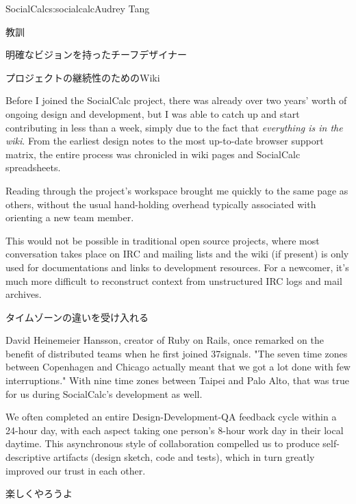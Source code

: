 \begin{aosachapter}{SocialCalc}{s:socialcalc}{Audrey Tang}
\begin{aosasect1}{教訓}
\begin{aosasect2}{明確なビジョンを持ったチーフデザイナー}
\end{aosasect2}

\begin{aosasect2}{プロジェクトの継続性のためのWiki}

Before I joined the SocialCalc project, there was already over two
years' worth of ongoing design and development, but I was able to
catch up and start contributing in less than a week, simply due to
the fact that \emph{everything is in the wiki}. From the earliest
design notes to the most up-to-date browser support matrix, the
entire process was chronicled in wiki pages and SocialCalc
spreadsheets.

Reading through the project's workspace brought me quickly to the same
page as others, without the usual hand-holding overhead
typically associated with orienting a new team member.

This would not be possible in traditional open source projects, where
most conversation takes place on IRC and mailing lists and the wiki
(if present) is only used for documentations and links to development
resources.  For a newcomer, it's much more difficult to reconstruct
context from unstructured IRC logs and mail archives.

\end{aosasect2}

\begin{aosasect2}{タイムゾーンの違いを受け入れる}

David Heinemeier Hansson, creator of Ruby on Rails, once remarked on
the benefit of distributed teams when he first joined 37signals. "The
seven time zones between Copenhagen and Chicago actually meant that
we got a lot done with few interruptions." With nine time zones
between Taipei and Palo Alto, that was true for us during
SocialCalc's development as well.

We often completed an entire Design-Development-QA feedback cycle
within a 24-hour day, with each aspect taking one person's 8-hour
work day in their local daytime.  This asynchronous style of
collaboration compelled us to produce self-descriptive artifacts
(design sketch, code and tests), which in turn greatly improved our
trust in each other.

\end{aosasect2}

\begin{aosasect2}{楽しくやろうよ}


\end{aosasect2}
\end{aosasect1}
\end{aosachapter}
